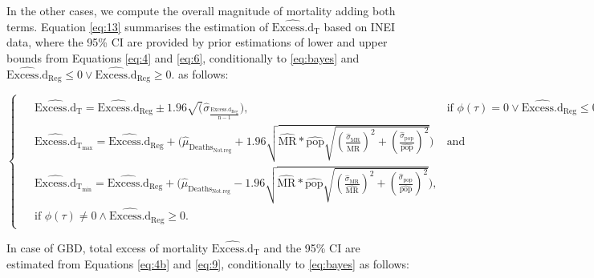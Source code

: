 \documentclass[
]{article}
\begin{document}
In the other cases, we compute the overall magnitude of mortality adding both terms. Equation \eqref{eq:13} summarises the estimation of \(\widehat{\text{Excess.d}}_\text{T}\) based on INEI data, where the 95\% CI are provided by prior estimations of lower and upper bounds from Equations \eqref{eq:4} and \eqref{eq:6}, conditionally to \eqref{eq:bayes} and \(\widehat{\text{Excess.d}}_\text{Reg} \le 0 \lor\widehat{\text{Excess.d}}_\text{Reg} \geq 0\). as follows:

\begin{equation} \label{eq:13}
      \begin{cases}
      \!\begin{aligned}
        & \widehat{\text{Excess.d}}_\text{T}= \widehat{\text{Excess.d}}_\text{Reg} 
        \pm 1.96\sqrt(\hat{\sigma}_\frac{{\text{Excess.d}}_\text{Reg}}{\text{n}-1}), 
        &\text{if }\phi(\tau)=0 \lor \widehat{\text{Excess.d}}_\text{Reg} \le 0,  \\[1ex]
        &\widehat{\text{Excess.d}}_{\text{T}_\text{max}} = \widehat{\text{Excess.d}}_\text{Reg}+
        \Big(\widehat{\mu}_{\text{Deaths}_\text{Not.reg}}+
        1.96\sqrt{\widehat{\text{MR}}*\widehat{\text{pop}}\sqrt{(\frac{\hat{\sigma}_\text{MR}}{\widehat{\text{MR}}})^2+
        (\frac{\hat{\sigma}_\text{pop}}{\widehat{\text{pop}}})^2}}\Big) & \text{and }\\[1ex]
        &\widehat{\text{Excess.d}}_{\text{T}_\text{min}} =  \widehat{\text{Excess.d}}_\text{Reg}+
        \Big(\widehat{\mu}_{\text{Deaths}_\text{Not.reg}}-
        1.96\sqrt{\widehat{\text{MR}}*\widehat{\text{pop}}\sqrt{(\frac{\hat{\sigma}_\text{MR}}{\widehat{\text{MR}}})^2+
        (\frac{\hat{\sigma}_\text{pop}}{\widehat{\text{pop}}})^2}}\Big),\\[1ex]
        &\text{if }\phi(\tau) \neq 0  \land \widehat{\text{Excess.d}}_\text{Reg} \geq 0.
    \end{aligned}
  \end{cases}
  \end{equation}

In case of GBD, total excess of mortality \(\widehat{\text{Excess.d}}_\text{T}\) and the 95\% CI are estimated from Equations \eqref{eq:4b} and \eqref{eq:9}, conditionally to \eqref{eq:bayes} as follows:
\end{document}
